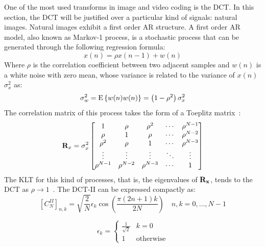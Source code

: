 \documentclass[11pt,a4paper,openright,twoside]{book}
\numberwithin{equation}{section} %
\begin{document}
One of the most used transforms in image and video coding is the
\ac{DCT}.
In this section, the \ac{DCT} will be justified over a particular kind
of signals: natural images.
Natural images exhibit a first order \ac{AR} structure.
A first order \ac{AR} model, also known as Markov-1 process, is a
stochastic process that can be generated through the following
regression formula:
\begin{equation}
	x(n) = \rho x(n-1) + w(n)
	\label{eqn:first_order_ar_model}
\end{equation}
Where $\rho$ is the correlation coefficient between two adjacent samples
and $w(n)$ is a white noise with zero mean, whose variance is related to
the variance of $x(n)$ $\sigma_x^2$ as:
\begin{equation}
	\sigma_w^2 = \text{E}\left\{ w(n) w(n) \right\} =
	\left(1-\rho^2\right)\sigma_x^2
\end{equation}
The correlation matrix of this process takes the form of a Toeplitz
matrix~\cite{akansu-12-toeplitz-approximation}:
\begin{equation}
	\mathbf{R}_x = \sigma_x^2
	\begin{bmatrix}
		1          & \rho       & \rho^2     & \cdots & \rho^{N-1} \\
		\rho       & 1          & \rho       & \cdots & \rho^{N-2} \\
		\rho^2     & \rho       & 1          & \cdots & \rho^{N-3} \\
		\vdots     & \vdots     & \vdots     & \ddots & \vdots     \\
		\rho^{N-1} & \rho^{N-2} & \rho^{N-3} & \cdots & 1
	\end{bmatrix}
	\label{eqn:toeplitz_matrix}
\end{equation}
The \ac{KLT} for this kind of processes, that is, the eigenvalues of
$\mathbf{R}_{\mathbf{x}}$, tends to the \ac{DCT} as $\rho\to1$~\cite{britanak-06-dct-and-dst}.
The \ac{DCT}-II can be expressed compactly as:
\begin{equation}
	{\left[C_{N}^{II} \right]}_{n,k} =
	\sqrt{\frac{2}{N}}\epsilon_k\cos\left(\frac{\pi(2n+1)k}{2N}\right)
	\quad
	n,k=0,\dots,N-1
	\label{eqn:dct_ii}
\end{equation}

\begin{equation}
	\epsilon_k =
	\begin{cases}
		\frac{1}{\sqrt{2}} & k = 0 \\
		1 & \text{otherwise}
	\end{cases}
\end{equation}
\end{document}
